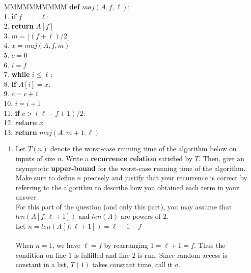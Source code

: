 \documentclass{article}
\begin{document}
\begin{enumerate}
\begin{tabbing}
	MM\=MM\=MM\=MM\=MM\=\kill
	\>\textbf{def} $maj(A,f, \ell)$:\\
	1.\>  \>  \textbf{if} $f ==\ell$:\\ 
  2.\>  \>  \>  \textbf{return} $A[f]$\label{base}\\
	3.\>  \>  $m = \lfloor (f+\ell)/ 2\rfloor$\label{mdef}\\
	4.\>  \>  $x = maj(A,f,m)$\label{majrec1}\\
	5.\>  \>  $c = 0$\\
	6.\>  \>  $i = f$\label{winit}\\
	7.\>  \>  \textbf{while} $i \leq \ell$:\label{wloop}\\
	8.\>  \> \> \textbf{if} $A[i] = x$: \\ 
	9.\>  \> \>  \> $c = c +1$\label{comps}\\
	10.\>  \> \>  $i = i +1$\label{endloop}\\
  11.\>  \>  \textbf{if} $c >   (\ell -f+1)/2$:\label{test}\\
  12.\>  \>  \>  \textbf{return} $x$\label{majret1}\\
  13.\>  \>  \textbf{return}  $maj(A,m+1,\ell)$\label{majrec2}
\end{tabbing}


\begin{enumerate}
\item Let $T(n)$ denote the worst-case running time of the algorithm below on inputs of size $n$.
Write a \textbf{recurrence relation} satisfied by $T$. 
Then, give an asymptotic \textbf{upper-bound} for the worst-case running time of the algorithm. \\

Make sure to define $n$ precisely and justify that your recurrence is correct 
by referring to the algorithm to describe how you obtained each term in your answer.\\
For this part of the question (and only this part), you may assume that  $len(A[f:\ell+1])$ and $len(A)$ are powers of 2.\\

Let $n = len(A[f:\ell+1]) = \ell+1 - f$\\\\
When $n = 1$, we have $\ell = f$ by rearranging $1 = \ell + 1 = f$.
Thus the condition on line 1 is fulfilled and line 2 is run.
Since random access is constant in a list, $T(1)$ takes constant time,
call it $a$.\\\\


\end{enumerate}
\end{enumerate}
\end{document}
